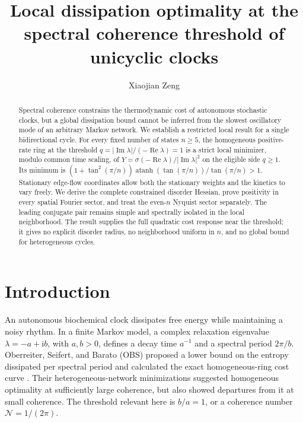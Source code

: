 \documentclass[aps,pre,onecolumn,11pt,notitlepage,nofootinbib]{revtex4-2}
\newcommand{\atanh}{\operatorname{atanh}}
\newcommand{\Repart}{\operatorname{Re}}
\newcommand{\Impart}{\operatorname{Im}}
\begin{document}
\title{Local dissipation optimality at the spectral coherence threshold of unicyclic clocks}
\author{Xiaojian Zeng}
\begin{abstract}
Spectral coherence constrains the thermodynamic cost of autonomous stochastic clocks, but a global dissipation bound cannot be inferred from the slowest oscillatory mode of an arbitrary Markov network. We establish a restricted local result for a single bidirectional cycle. For every fixed number of states $n\geq5$, the homogeneous positive-rate ring at the threshold $q=|\Impart\lambda|/(-\Repart\lambda)=1$ is a strict local minimizer, modulo common time scaling, of $Y=\sigma(-\Repart\lambda)/|\Impart\lambda|^2$ on the eligible side $q\geq1$. Its minimum is $(1+\tan^2(\pi/n))\atanh(\tan(\pi/n))/\tan(\pi/n)>1$. Stationary edge-flow coordinates allow both the stationary weights and the kinetics to vary freely. We derive the complete constrained disorder Hessian, prove positivity in every spatial Fourier sector, and treat the even-$n$ Nyquist sector separately. The leading conjugate pair remains simple and spectrally isolated in the local neighborhood. The result supplies the full quadratic cost response near the threshold; it gives no explicit disorder radius, no neighborhood uniform in $n$, and no global bound for heterogeneous cycles.
\end{abstract}
\maketitle
\enlargethispage{6pt}

\section{Introduction}
An autonomous biochemical clock dissipates free energy while maintaining a noisy rhythm. In a finite Markov model, a complex relaxation eigenvalue $\lambda=-a+\mathrm{i}b$, with $a,b>0$, defines a decay time $a^{-1}$ and a spectral period $2\pi/b$. Oberreiter, Seifert, and Barato (OBS) proposed a lower bound on the entropy dissipated per spectral period and calculated the exact homogeneous-ring cost curve \cite{OBS2022}. Their heterogeneous-network minimizations suggested homogeneous optimality at sufficiently large coherence, but also showed departures from it at small coherence. The threshold relevant here is $b/a=1$, or a coherence number $\mathcal N=1/(2\pi)$.
\end{document}
